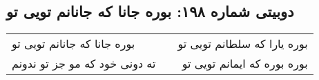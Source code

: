 \begin{center}
\section*{دوبیتی شماره ۱۹۸: بوره جانا که جانانم تویی تو}
\label{sec:198}
\begin{longtable}{l p{0.5cm} r}
بوره جانا که جانانم تویی تو
&&
بوره یارا که سلطانم تویی تو
\\
ته دونی خود که مو جز تو ندونم
&&
بوره بوره که ایمانم تویی تو
\\
\end{longtable}
\end{center}
